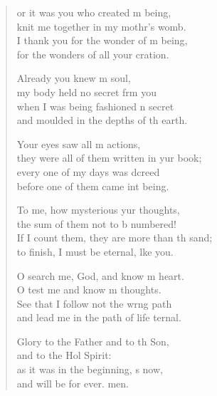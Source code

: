\settowidth{\versewidth}{If I count them, they are more than the sand; *}
\begin{verse}%
  \begin{patverse}
or it was you who created m being,\Med\\
knit me together in my mothr’s womb.\\
I thank you for the wonder of m being,\Med\\
for the wonders of all your cration.

Already you knew m soul,\Med\\
my body held no secret frm you\\
when I was being fashioned \pointup{\i}n secret\Med\\
and moulded in the depths of th earth.

Your eyes saw all m actions,\Med\\
they were all of them written in yur book;\\
every one of my days was dcreed\Med\\
before one of them came int being.

To me, how mysterious yur thoughts,\Med\\
the sum of them not to b numbered!\\
If I count them, they are more than th sand;\Med\\
to finish, I must be eternal, l\pointup{\i}ke you.

O search me, God, and know m heart.\Med\\
O test me and know m thoughts.\\
See that I follow not the wrng path\Med\\
and lead me in the path of life ternal.

Glory to the Father and to th Son,\Med\\
and to the Hol Spirit:\\
as it was in the beginning, \pointup{\i}s now,\Med\\
and will be for ever. men.
  \end{patverse}
\end{verse}
